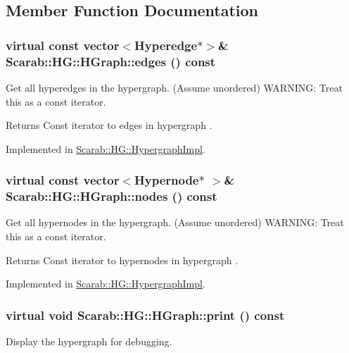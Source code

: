 \subsection{Member Function Documentation}
\hypertarget{class_scarab_1_1_h_g_1_1_h_graph_a57328729f90cc4152ca79ff15ecdd4bb}{
\subsubsection[{edges}]{\setlength{\rightskip}{0pt plus 5cm}virtual const vector$<${\bf Hyperedge}$\ast$$>$\& Scarab::HG::HGraph::edges () const}}
\label{class_scarab_1_1_h_g_1_1_h_graph_a57328729f90cc4152ca79ff15ecdd4bb}
Get all hyperedges in the hypergraph. (Assume unordered) WARNING: Treat this as a const iterator. \begin{DoxyReturn}{Returns}
Const iterator to edges in hypergraph . 
\end{DoxyReturn}


Implemented in \hyperlink{class_scarab_1_1_h_g_1_1_hypergraph_impl_a0c8373e545fe59b0cb7036b4751508e1}{Scarab::HG::HypergraphImpl}.

\hypertarget{class_scarab_1_1_h_g_1_1_h_graph_a74d893fba015520774f71f02a46bb6ca}{
\subsubsection[{nodes}]{\setlength{\rightskip}{0pt plus 5cm}virtual const vector$<${\bf Hypernode}$\ast$ $>$\& Scarab::HG::HGraph::nodes () const}}
\label{class_scarab_1_1_h_g_1_1_h_graph_a74d893fba015520774f71f02a46bb6ca}
Get all hypernodes in the hypergraph. (Assume unordered) WARNING: Treat this as a const iterator. \begin{DoxyReturn}{Returns}
Const iterator to hypernodes in hypergraph . 
\end{DoxyReturn}


Implemented in \hyperlink{class_scarab_1_1_h_g_1_1_hypergraph_impl_a9aef2881b489c86d4d83e996a70f8141}{Scarab::HG::HypergraphImpl}.

\hypertarget{class_scarab_1_1_h_g_1_1_h_graph_ab5aa11c932b28864b56f28e0babbc1c1}{
\subsubsection[{print}]{\setlength{\rightskip}{0pt plus 5cm}virtual void Scarab::HG::HGraph::print () const}}
\label{class_scarab_1_1_h_g_1_1_h_graph_ab5aa11c932b28864b56f28e0babbc1c1}
Display the hypergraph for debugging. 

